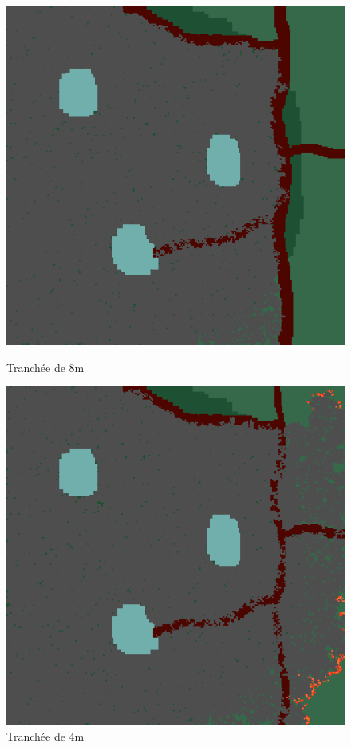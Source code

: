 \documentclass[12pt]{article}
\begin{document}
\begin{figure}[!h]
    \centering
    \begin{minipage}{0.35\textwidth}
      \centering
      \includegraphics[width=.8\linewidth]{pictures/trans/treach.png}
      \caption{Tranchée de $8$m}\label{Fig:Data9}
    \end{minipage}\hfill
    \begin{minipage}{0.35\textwidth}
      \centering
      \includegraphics[width=.8\linewidth]{pictures/trans/little_treach.png}
      \caption{Tranchée de $4$m}\label{Fig:Data10}
    \end{minipage}
\end{figure}
\end{document}

